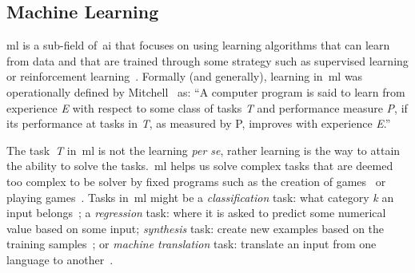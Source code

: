 



\subsection{Machine Learning}

\acrfull{ml} is a sub-field of~\acrshort{ai} that focuses on using learning algorithms that can learn from data and that are trained through some strategy such as supervised learning or reinforcement learning~\cite{goodfellow_deep_2016}. Formally (and generally), learning in~\acrshort{ml} was operationally defined by Mitchell~\cite{mitchell_machine_1997} as: “A computer program is said to learn from experience \textit{E} with respect to some class of tasks \textit{T} and performance measure \textit{P}, if its performance at tasks in \textit{T}, as measured by P, improves with experience \textit{E}.” 

The task~\textit{T} in~\acrshort{ml} is not the learning \textit{per se}, rather learning is the way to attain the ability to solve the tasks.~\acrshort{ml} helps us solve complex tasks that are deemed too complex to be solver by fixed programs such as the creation of games~\cite{summerville_procedural_2018} or playing games~\cite{mnih_human-level_2015,justesen_deep_2020}. Tasks in~\acrshort{ml} might be a \emph{classification} task: what category \textit{k} an input belongs~\cite{clanuwat_kuronet_2019}; a \emph{regression} task: where it is asked to predict some numerical value based on some input; \emph{synthesis} task: create new examples based on the training samples~\cite{torrado_bootstrapping_2020}; or \emph{machine translation} task: translate an input from one language to another~\cite{hartmann_comparing_2019}.

